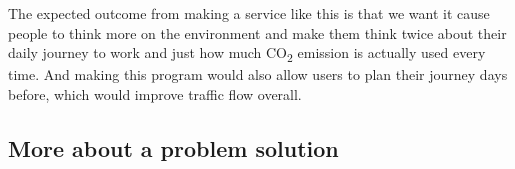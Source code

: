The expected outcome from making a service like this is that we want it cause people to think more on the environment
and make them think twice about their daily journey to work and just how much \unit{CO_{2}} emission is actually used
every time.
And making this program would also allow users to plan their journey days before, which would improve traffic flow
overall.


\subsection{More about a problem solution}\label{subsec:more-about-a-problem-solution}

